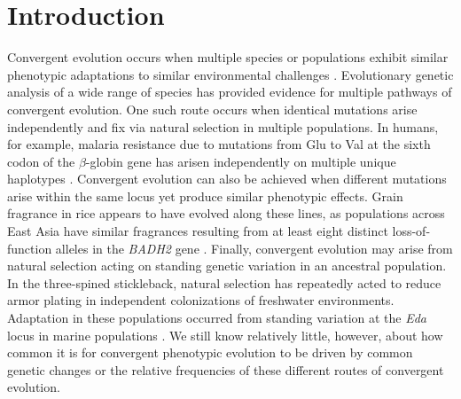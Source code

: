 \section*{Introduction}
\noindent Convergent evolution occurs when multiple species or populations exhibit similar phenotypic adaptations to similar environmental challenges \cite[]{Wood_2005_15881688,Arendt_2008_18022278,Elmer_2011_21459472}.
Evolutionary genetic analysis of a wide range of species has provided evidence for multiple pathways of convergent evolution. 
One such route occurs when identical mutations arise independently and fix via natural selection in multiple populations. In humans, for example, malaria resistance due to mutations from Glu to Val at the sixth codon of the $\beta$-globin gene has arisen independently on multiple unique haplotypes  \cite[]{Currat_2002_11741197,Kwiatkowski_2005_16001361}.  
Convergent evolution can also be achieved when different mutations arise within the same locus yet produce similar phenotypic effects.  
Grain fragrance in rice appears to have evolved along these lines, as populations across East Asia have similar fragrances resulting from at least eight distinct loss-of-function alleles in the  \emph{BADH2} gene \cite[]{Kovach_2009_19706531}.  
Finally, convergent evolution may arise from natural selection acting on standing genetic variation in an ancestral population.  
In the three-spined stickleback, natural selection has repeatedly acted to reduce armor plating in independent colonizations of freshwater environments.  
Adaptation in these populations occurred from standing variation at the \emph{Eda} locus in marine populations \cite[]{Colosimo_2005_15790847}.  
We still know relatively little, however, about how common it is for convergent phenotypic evolution to be driven by common genetic changes or the relative frequencies of these different routes of convergent evolution.



